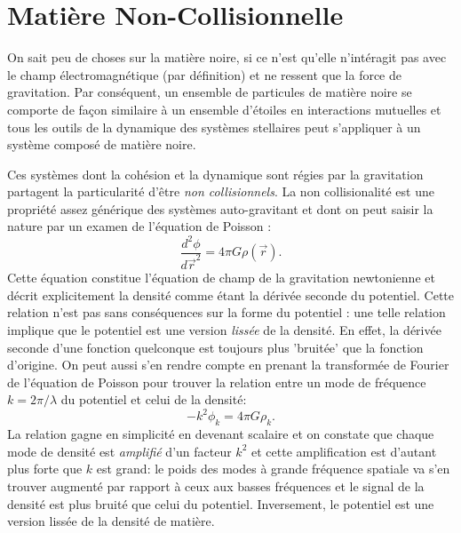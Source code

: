 \section{Matière Non-Collisionnelle}
On sait peu de choses sur la matière noire, si ce n'est qu'elle n'intéragit pas avec le champ électromagnétique (par définition) et ne ressent que la force de gravitation. Par conséquent, un ensemble de particules de matière noire se comporte de façon similaire à un ensemble d'étoiles en interactions mutuelles et tous les outils de la dynamique des systèmes stellaires peut s'appliquer à un système composé de matière noire.

Ces systèmes dont la cohésion et la dynamique sont régies par la gravitation partagent la particularité d'être \textit{non collisionnels}. La non collisionalité est une propriété assez générique des systèmes auto-gravitant  et dont on peut saisir la nature par un examen de l'équation de Poisson  :
\begin{equation}
\frac{d^2\phi}{d\vec{r}^2}=4\pi G\rho(\vec{r}).
\end{equation} 
Cette équation constitue l'équation de champ de la gravitation newtonienne et décrit explicitement la densité comme étant la dérivée seconde du potentiel. Cette relation n'est pas sans conséquences sur la forme du potentiel : une telle relation implique que le potentiel est une version \textit{lissée} de la densité. En effet, la dérivée seconde d'une fonction quelconque est toujours plus 'bruitée' que la fonction d'origine. On peut aussi s'en rendre compte en prenant la transformée de Fourier de l'équation de Poisson pour trouver la relation entre un mode de fréquence $k=2\pi/\lambda$ du potentiel et celui de la densité:
\begin{equation}
-k^2 \phi_k=4\pi G \rho_k.
\end{equation}
La relation gagne en simplicité en devenant scalaire et on constate que chaque mode de densité est \textit{amplifié} d'un facteur $k^2$ et cette amplification est d'autant plus forte que $k$ est grand: le poids des modes à grande fréquence spatiale va s'en trouver augmenté par rapport à ceux aux basses fréquences et le signal de la densité est plus bruité que celui du potentiel. Inversement, le potentiel est une version lissée de la densité de matière.
